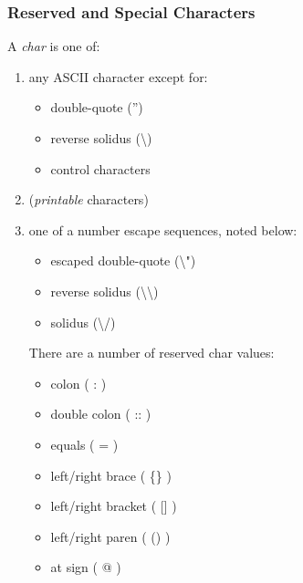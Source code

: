 \documentclass{memarticle}
\begin{document}
		\subsubsection{Reserved and Special Characters}
			A \emph{char} is one of:
			\begin{enumerate}
				\item any ASCII character except for:
				\begin{itemize}
					\item double-quote ('') 
					\item reverse solidus (\textbackslash)
					\item control characters
				\end{itemize}
				\item (\emph{printable} characters)
				\item one of a number escape sequences, noted below:
				\begin{itemize}
					\item escaped double-quote (\textbackslash")
					\item reverse solidus (\textbackslash\textbackslash)
					\item solidus (\textbackslash/)
				\end{itemize}
				There are a number of reserved char values:
				\begin{itemize}
					\item colon ( : )
					\item double colon ( :: )
					\item equals ( = )
					\item left/right brace ( \{\} )
					\item left/right bracket ( [] )
					\item left/right paren ( () )
					\item at sign ( @ )
				\end{itemize}		
			\end{enumerate}
			
\end{document}
